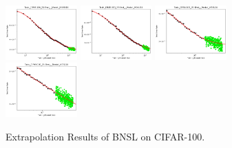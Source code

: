 \documentclass{article} %
\begin{document}
\begin{figure}
\includegraphics[width=0.245\textwidth]{figures/scaling_laws_benchmark_dataset_plots/c100_25___MiX_B_16.png}
\includegraphics[width=0.245\textwidth]{figures/scaling_laws_benchmark_dataset_plots/c100_25___MiX_L_16.png}
\includegraphics[width=0.245\textwidth]{figures/scaling_laws_benchmark_dataset_plots/c100_25___ViT_B_16.png}
\includegraphics[width=0.245\textwidth]{figures/scaling_laws_benchmark_dataset_plots/c100_25___ViT_S_16.png}

    \caption{
    Extrapolation Results of BNSL on CIFAR-100.
    }
    \label{fig:scaling_laws_benchmark_dataset__cifar_100}
\end{figure}
\end{document}

